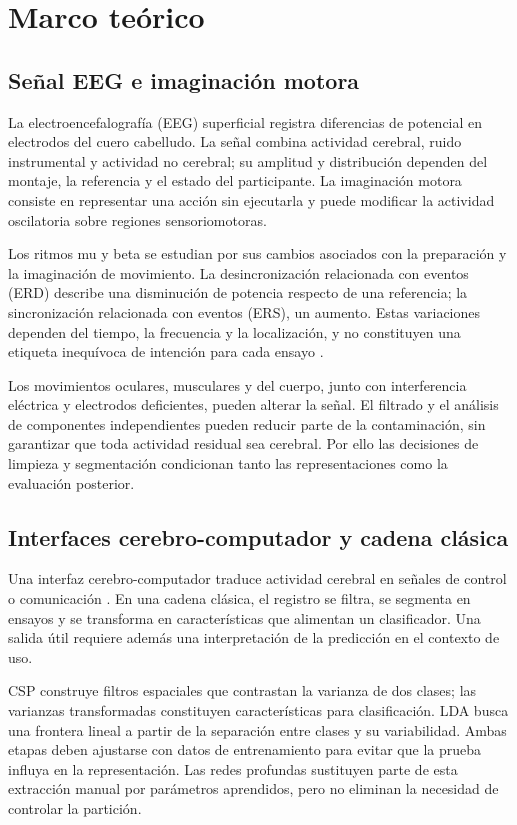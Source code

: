 \section{Marco teórico}
\subsection{Señal EEG e imaginación motora}
La electroencefalografía (EEG) superficial registra diferencias de potencial en electrodos del cuero cabelludo. La señal combina actividad cerebral, ruido instrumental y actividad no cerebral; su amplitud y distribución dependen del montaje, la referencia y el estado del participante. La imaginación motora consiste en representar una acción sin ejecutarla y puede modificar la actividad oscilatoria sobre regiones sensoriomotoras.

Los ritmos mu y beta se estudian por sus cambios asociados con la preparación y la imaginación de movimiento. La desincronización relacionada con eventos (ERD) describe una disminución de potencia respecto de una referencia; la sincronización relacionada con eventos (ERS), un aumento. Estas variaciones dependen del tiempo, la frecuencia y la localización, y no constituyen una etiqueta inequívoca de intención para cada ensayo \cite{neuper2006,pfurtscheller1999}.

Los movimientos oculares, musculares y del cuerpo, junto con interferencia eléctrica y electrodos deficientes, pueden alterar la señal. El filtrado y el análisis de componentes independientes pueden reducir parte de la contaminación, sin garantizar que toda actividad residual sea cerebral. Por ello las decisiones de limpieza y segmentación condicionan tanto las representaciones como la evaluación posterior.

\subsection{Interfaces cerebro-computador y cadena clásica}
Una interfaz cerebro-computador traduce actividad cerebral en señales de control o comunicación \cite{wolpaw2007bci}. En una cadena clásica, el registro se filtra, se segmenta en ensayos y se transforma en características que alimentan un clasificador. Una salida útil requiere además una interpretación de la predicción en el contexto de uso.

CSP construye filtros espaciales que contrastan la varianza de dos clases; las varianzas transformadas constituyen características para clasificación. LDA busca una frontera lineal a partir de la separación entre clases y su variabilidad. Ambas etapas deben ajustarse con datos de entrenamiento para evitar que la prueba influya en la representación. Las redes profundas sustituyen parte de esta extracción manual por parámetros aprendidos, pero no eliminan la necesidad de controlar la partición.

